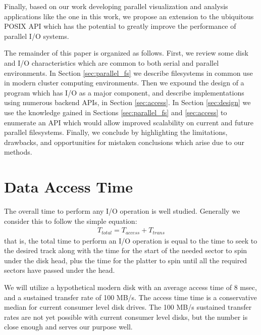 Finally, based on our work developing parallel visualization and
analysis applications like the one in this work, we propose an
extension to the ubiquitous POSIX API which has the potential to
greatly improve the performance of parallel I/O systems.

The remainder of this paper is organized as follows.  First, we review
some disk and I/O characteristics which are common to both serial and
parallel environments.  In Section \ref{sec:parallel_fs} we describe
filesystems in common use in modern cluster computing environments.
Then we expound the design of a program which has I/O as a major
component, and describe implementations using numerous backend APIs, in
Section \ref{sec:access}.  In Section \ref{sec:design} we use the
knowledge gained in Sections
\ref{sec:parallel_fs} and \ref{sec:access} to enumerate an API which
would allow improved scalability on current and future parallel
filesystems.  Finally, we conclude by highlighting the limitations,
drawbacks, and opportunities for mistaken conclusions which arise due
to our methods.

\section{Data Access Time}\label{sec:basics}

The overall time to perform any I/O operation is well studied.
Generally we consider this to follow the simple equation:
\begin{align*}
  T_{total} = T_{access} + T_{trans}
\end{align*}
that is, the total time to perform an I/O operation is equal to the
time to seek to the desired track along with the time for the start of
the needed sector to spin under the disk head, plus the time for the
platter to spin until all the required sectors have passed under the
head.

We will utilize a hypothetical modern disk with an average access
time of 8 msec, and a sustained transfer rate of 100 MB/s. The access
time time is a conservative median for current consumer level disk
drives. The 100 MB/s sustained transfer rates are not yet possible with
current consumer level disks, but the number is close enough and serves
our purpose well.


